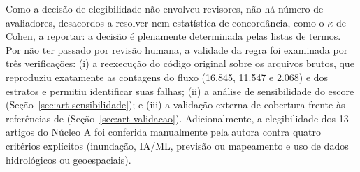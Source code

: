 Como a decisão de elegibilidade não envolveu revisores, não há número de avaliadores, desacordos a resolver nem estatística de concordância, como o $\kappa$ de Cohen, a reportar: a decisão é plenamente determinada pelas listas de termos. Por não ter passado por revisão humana, a validade da regra foi examinada por três verificações: (i) a reexecução do código original sobre os arquivos brutos, que reproduziu exatamente as contagens do fluxo (16.845, 11.547 e 2.068) e dos estratos e permitiu identificar suas falhas; (ii) a análise de sensibilidade do escore (Seção~\ref{sec:art-sensibilidade}); e (iii) a validação externa de cobertura frente às referências de  (Seção~\ref{sec:art-validacao}). Adicionalmente, a elegibilidade dos 13 artigos do Núcleo A foi conferida manualmente pela autora contra quatro critérios explícitos (inundação, IA/ML, previsão ou mapeamento e uso de dados hidrológicos ou geoespaciais). 



